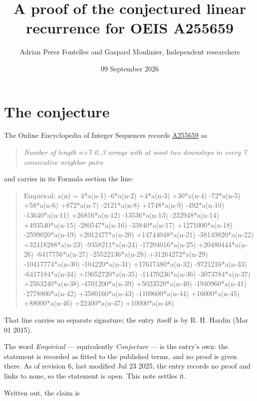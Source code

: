 \documentclass[11pt]{article}
\title{A proof of the conjectured linear recurrence for OEIS A255659}
\author{Adrian Perez Fontelles and Gaspard Moulinier, Independent researchers}
\date{09 September 2026}
\theoremstyle{definition}
\begin{document}
\maketitle
\section{The conjecture}

The Online Encyclopedia of Integer Sequences records \href{https://oeis.org/A255659}{A255659} as

\begin{quote}\itshape Number of length n+7 0..3 arrays with at most two downsteps in every 7 consecutive neighbor pairs\end{quote}

and carries in its Formula section the line:

\begin{quote}\ttfamily Empirical: a(n) = 4*a(n-1) -6*a(n-2) +4*a(n-3) +30*a(n-4) -72*a(n-5) +58*a(n-6) +872*a(n-7) -2121*a(n-8) +1748*a(n-9) -492*a(n-10) -13640*a(n-11) +26816*a(n-12) -13536*a(n-13) -232948*a(n-14) +493540*a(n-15) -280547*a(n-16) -33840*a(n-17) +1271000*a(n-18) -2599020*a(n-19) +2012477*a(n-20) +14744048*a(n-21) -38149820*a(n-22) +32418288*a(n-23) -9358211*a(n-24) -17204016*a(n-25) +20480444*a(n-26) -6417756*a(n-27) -25522136*a(n-28) +31264272*a(n-29) -10417774*a(n-30) -104220*a(n-31) +17617480*a(n-32) -9721216*a(n-33) -6417184*a(n-34) +19052720*a(n-35) -11470236*a(n-36) -3073784*a(n-37) +2563240*a(n-38) -4701200*a(n-39) +5023520*a(n-40) -1940960*a(n-41) -2778800*a(n-42) +3580160*a(n-43) -1109600*a(n-44) +16000*a(n-45) +88000*a(n-46) +22400*a(n-47) +10000*a(n-48)\end{quote}

That line carries no separate signature; the entry itself is by R. H. Hardin (Mar 01 2015).

The word {\itshape Empirical} --- equivalently {\itshape Conjecture} --- is the entry's own: the statement is recorded as fitted to the published terms, and no proof is given there. As of revision 6, last modified Jul 23 2025, the entry records no proof and links to none, so the statement is open. This note settles it.

Written out, the claim is
\end{document}
